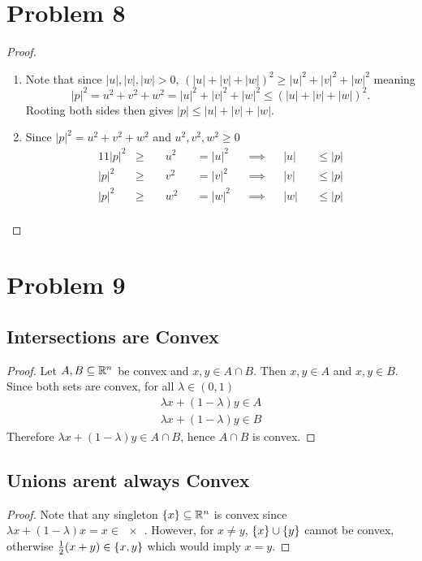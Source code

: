 \documentclass{eeleyes}
\begin{document}
\section*{Problem 8}
\begin{proof}
\begin{enumerate}[label=\alph*)]
    \item Note that since $|u|, |v|, |w| > 0$, $(|u| + |v| + |w|)^2 \geq |u|^2 + |v|^2 + |w|^2$ meaning
        \[
            |p|^2 = u^2 + v^2 + w^2 = |u|^2 + |v|^2 + |w|^2 \leq (|u| + |v| + |w|)^2
        .\]
        Rooting both sides then gives $|p| \leq |u| + |v| + |w|$.
        
    \item Since $|p|^2 = u^2 + v^2 + w^2$ and $u^2, v^2, w^2 \geq 0$
        \begin{alignat*}{11}
            |p|^2 &\geq\; &&u^2 &&= |u|^2 &&\implies &&|u| &&\leq |p| \\
            |p|^2 &\geq\; &&v^2 &&= |v|^2 &&\implies &&|v| &&\leq |p| \\
            |p|^2 &\geq\; &&w^2 &&= |w|^2 &&\implies &&|w| &&\leq |p| \\
        \end{alignat*}
\end{enumerate}
\end{proof}

\section*{Problem 9}
\subsection*{Intersections are Convex}
\begin{proof}
    Let $A, B \subseteq \mathbb{R}^n$ be convex and $x,y \in A \cap B$. Then $x,y \in A$ and $x,y \in B$. Since both sets are convex, for all $\lambda \in (0,1)$
    \begin{align*}
        \lambda x + (1-\lambda) y \in A \\
        \lambda x + (1-\lambda) y \in B
    \end{align*}
    Therefore $\lambda x + (1 - \lambda) y \in A \cap B$, hence $A \cap B$ is convex.
\end{proof}

\subsection*{Unions arent always Convex}
\begin{proof}
    Note that any singleton $\qty{x} \subseteq \mathbb{R}^n$ is convex since $\lambda x + (1-\lambda) x = x \in \qty{x}$. However, for $x \neq y$, $\qty{x} \cup \qty{y}$ cannot be convex, otherwise $\frac{1}{2} (x+y) \in \qty{x,y}$ which would imply $x = y$.
\end{proof}
\end{document}
